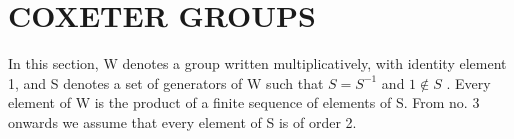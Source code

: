 \section{COXETER GROUPS}

In this section, W denotes a group written multiplicatively, with identity element 1, and S denotes a set of generators of W such that \(S = S^{-1}\) and \(1 \notin S\) . Every element of W is the product of a finite sequence of elements of S. From no. 3 onwards we assume that every element of S is of order 2.

